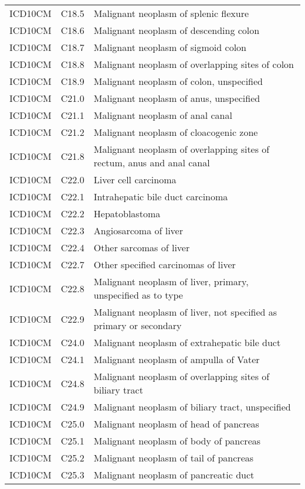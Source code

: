 \begin{longtable}{p{}p{}p{}}
  ICD10CM & C18.5 & Malignant neoplasm of splenic flexure \\ 
  ICD10CM & C18.6 & Malignant neoplasm of descending colon \\ 
  ICD10CM & C18.7 & Malignant neoplasm of sigmoid colon \\ 
  ICD10CM & C18.8 & Malignant neoplasm of overlapping sites of colon \\ 
  ICD10CM & C18.9 & Malignant neoplasm of colon, unspecified \\ 
  ICD10CM & C21.0 & Malignant neoplasm of anus, unspecified \\ 
  ICD10CM & C21.1 & Malignant neoplasm of anal canal \\ 
  ICD10CM & C21.2 & Malignant neoplasm of cloacogenic zone \\ 
  ICD10CM & C21.8 & Malignant neoplasm of overlapping sites of rectum, anus and anal canal \\ 
  ICD10CM & C22.0 & Liver cell carcinoma \\ 
  ICD10CM & C22.1 & Intrahepatic bile duct carcinoma \\ 
  ICD10CM & C22.2 & Hepatoblastoma \\ 
  ICD10CM & C22.3 & Angiosarcoma of liver \\ 
  ICD10CM & C22.4 & Other sarcomas of liver \\ 
  ICD10CM & C22.7 & Other specified carcinomas of liver \\ 
  ICD10CM & C22.8 & Malignant neoplasm of liver, primary, unspecified as to type \\ 
  ICD10CM & C22.9 & Malignant neoplasm of liver, not specified as primary or secondary \\ 
  ICD10CM & C24.0 & Malignant neoplasm of extrahepatic bile duct \\ 
  ICD10CM & C24.1 & Malignant neoplasm of ampulla of Vater \\ 
  ICD10CM & C24.8 & Malignant neoplasm of overlapping sites of biliary tract \\ 
  ICD10CM & C24.9 & Malignant neoplasm of biliary tract, unspecified \\ 
  ICD10CM & C25.0 & Malignant neoplasm of head of pancreas \\ 
  ICD10CM & C25.1 & Malignant neoplasm of body of pancreas \\ 
  ICD10CM & C25.2 & Malignant neoplasm of tail of pancreas \\ 
  ICD10CM & C25.3 & Malignant neoplasm of pancreatic duct \\ 

\end{longtable}
